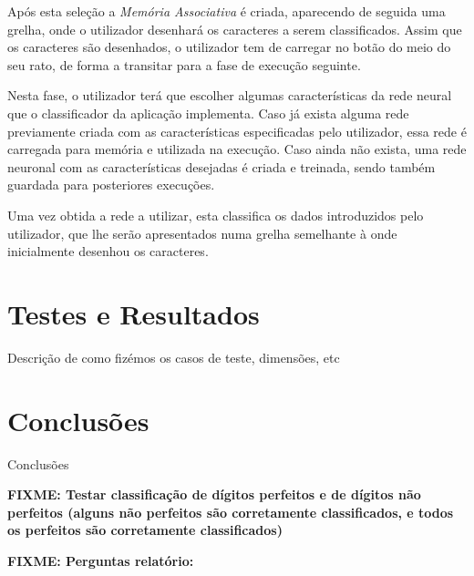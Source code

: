 \documentclass{article}
\begin{document}
Após esta seleção a \emph{Memória Associativa} é criada, aparecendo de seguida uma grelha, onde o utilizador desenhará os caracteres a serem classificados. Assim que os caracteres são desenhados, o utilizador tem de carregar no botão do meio do seu rato, de forma a transitar para a fase de execução seguinte.

Nesta fase, o utilizador terá que escolher algumas características da rede neural que o classificador da aplicação implementa. Caso já exista alguma rede previamente criada com as características especificadas pelo utilizador, essa rede é carregada para memória e utilizada na execução. Caso ainda não exista, uma rede neuronal com as características desejadas é criada e treinada, sendo também guardada para posteriores execuções. 

Uma vez obtida a rede a utilizar, esta classifica os dados introduzidos pelo utilizador, que lhe serão apresentados numa grelha semelhante à onde inicialmente desenhou os caracteres.


\pagebreak

\section{Testes e Resultados}

Descrição de como fizémos os casos de teste, dimensões, etc

\pagebreak

\section{Conclusões}

Conclusões

\textbf{FIXME: Testar classificação de dígitos perfeitos e de dígitos não perfeitos (alguns não perfeitos são corretamente classificados, e todos os perfeitos são corretamente classificados)}


\vspace{.3cm}

\textbf{FIXME: Perguntas relatório:}
\end{document}
